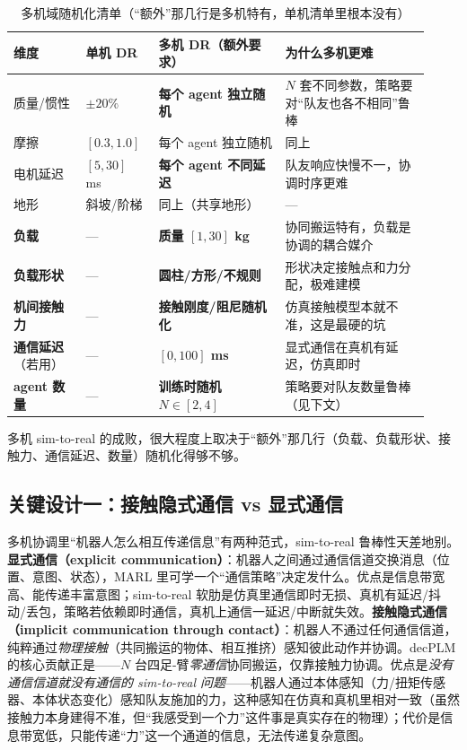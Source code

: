 \begin{table}[H]\centering\small
\caption{多机域随机化清单（“额外”那几行是多机特有，单机清单里根本没有）}
\label{tab:mc-dr}
\begin{tabular}{p{0.16\linewidth}p{0.16\linewidth}p{0.28\linewidth}p{0.32\linewidth}}
\toprule
维度 & 单机 DR & 多机 DR（额外要求） & 为什么多机更难 \\
\midrule
质量/惯性 & $\pm 20\%$ & \textbf{每个 agent 独立随机} & $N$ 套不同参数，策略要对“队友也各不相同”鲁棒 \\
摩擦 & $[0.3,1.0]$ & 每个 agent 独立随机 & 同上 \\
电机延迟 & $[5,30]$ ms & \textbf{每个 agent 不同延迟} & 队友响应快慢不一，协调时序更难 \\
地形 & 斜坡/阶梯 & 同上（共享地形） & --- \\
\textbf{负载} & --- & \textbf{质量 $[1,30]$ kg} & 协同搬运特有，负载是协调的耦合媒介 \\
\textbf{负载形状} & --- & \textbf{圆柱/方形/不规则} & 形状决定接触点和力分配，极难建模 \\
\textbf{机间接触力} & --- & \textbf{接触刚度/阻尼随机化} & 仿真接触模型本就不准，这是最硬的坑 \\
\textbf{通信延迟}（若用） & --- & \textbf{$[0,100]$ ms} & 显式通信在真机有延迟，仿真即时 \\
\textbf{agent 数量} & --- & \textbf{训练时随机 $N\in[2,4]$} & 策略要对队友数量鲁棒（见下文） \\
\bottomrule
\end{tabular}
\end{table}

\noindent 多机 sim-to-real 的成败，很大程度上取决于“额外”那几行（负载、负载形状、接触力、通信延迟、数量）随机化得够不够。

\subsection{关键设计一：接触隐式通信 vs 显式通信}
\label{sec:mc-implicit-comm}

多机协调里“机器人怎么相互传递信息”有两种范式，sim-to-real 鲁棒性天差地别。\textbf{显式通信（explicit communication）}：机器人之间通过通信信道交换消息（位置、意图、状态），MARL 里可学一个“通信策略”决定发什么。优点是信息带宽高、能传递丰富意图；sim-to-real 软肋是仿真里通信即时无损、真机有延迟/抖动/丢包，策略若依赖即时通信，真机上通信一延迟/中断就失效。\textbf{接触隐式通信（implicit communication through contact）}：机器人不通过任何通信信道，纯粹通过\emph{物理接触}（共同搬运的物体、相互推挤）感知彼此动作并协调。decPLM 的核心贡献正是——$N$ 台四足-臂\emph{零通信}协同搬运，仅靠接触力协调\cite{pandit2025decplm}。优点是\emph{没有通信信道就没有通信的 sim-to-real 问题}——机器人通过本体感知（力/扭矩传感器、本体状态变化）感知队友施加的力，这种感知在仿真和真机里相对一致（虽然接触力本身建得不准，但“我感受到一个力”这件事是真实存在的物理）；代价是信息带宽低，只能传递“力”这一个通道的信息，无法传递复杂意图。

